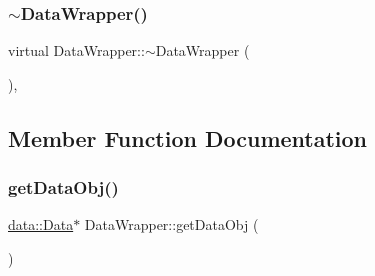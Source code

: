 \subsubsection{\texorpdfstring{$\sim$\+Data\+Wrapper()}{~DataWrapper()}}
{\footnotesize\ttfamily virtual Data\+Wrapper\+::$\sim$\+Data\+Wrapper (\begin{DoxyParamCaption}{ }\end{DoxyParamCaption})\hspace{0.3cm}{\ttfamily [inline]}, {\ttfamily [virtual]}}



\subsection{Member Function Documentation}
\mbox{\label{class_data_wrapper_a5e2993dd02f11ae2da8db95f942eca60}} 
\subsubsection{\texorpdfstring{get\+Data\+Obj()}{getDataObj()}}
{\footnotesize\ttfamily \mbox{\hyperlink{classdata_1_1_data}{data\+::\+Data}}$\ast$ Data\+Wrapper\+::get\+Data\+Obj (\begin{DoxyParamCaption}{ }\end{DoxyParamCaption})\hspace{0.3cm}{\ttfamily [inline]}}

